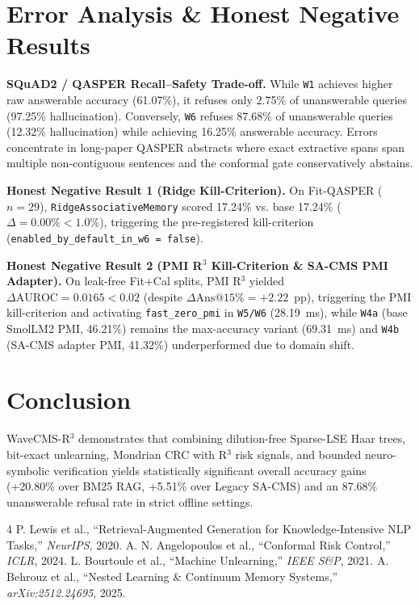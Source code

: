 \documentclass[conference]{IEEEtran}
\begin{document}
\section{Error Analysis \& Honest Negative Results}
\textbf{SQuAD2 / QASPER Recall--Safety Trade-off.} While \texttt{W1} achieves higher raw answerable accuracy (61.07\%), it refuses only 2.75\% of unanswerable queries (97.25\% hallucination). Conversely, \texttt{W6} refuses 87.68\% of unanswerable queries (12.32\% hallucination) while achieving 16.25\% answerable accuracy. Errors concentrate in long-paper QASPER abstracts where exact extractive spans span multiple non-contiguous sentences and the conformal gate conservatively abstains.

\textbf{Honest Negative Result 1 (Ridge Kill-Criterion).} On Fit-QASPER ($n=29$), \texttt{RidgeAssociativeMemory} scored 17.24\% vs. base 17.24\% ($\Delta = 0.00\% < 1.0\%$), triggering the pre-registered kill-criterion (\texttt{enabled\_by\_default\_in\_w6 = false}).

\textbf{Honest Negative Result 2 (PMI R$^3$ Kill-Criterion & SA-CMS PMI Adapter).} On leak-free Fit+Cal splits, PMI R$^3$ yielded $\Delta\text{AUROC} = 0.0165 < 0.02$ (despite $\Delta\text{Ans@15\%} = +2.22$~pp), triggering the PMI kill-criterion and activating \texttt{fast\_zero\_pmi} in \texttt{W5/W6} (28.19~ms), while \texttt{W4a} (base SmolLM2 PMI, 46.21\%) remains the max-accuracy variant (69.31~ms) and \texttt{W4b} (SA-CMS adapter PMI, 41.32\%) underperformed due to domain shift.

\section{Conclusion}
WaveCMS-R$^3$ demonstrates that combining dilution-free Sparse-LSE Haar trees, bit-exact unlearning, Mondrian CRC with R$^3$ risk signals, and bounded neuro-symbolic verification yields statistically significant overall accuracy gains (+20.80\% over BM25 RAG, +5.51\% over Legacy SA-CMS) and an 87.68\% unanswerable refusal rate in strict offline settings.

\begin{thebibliography}{4}
 P. Lewis et al., ``Retrieval-Augmented Generation for Knowledge-Intensive NLP Tasks,'' \emph{NeurIPS}, 2020.
 A. N. Angelopoulos et al., ``Conformal Risk Control,'' \emph{ICLR}, 2024.
 L. Bourtoule et al., ``Machine Unlearning,'' \emph{IEEE S\&P}, 2021.
 A. Behrouz et al., ``Nested Learning & Continuum Memory Systems,'' \emph{arXiv:2512.24695}, 2025.
\end{thebibliography}
\end{document}
